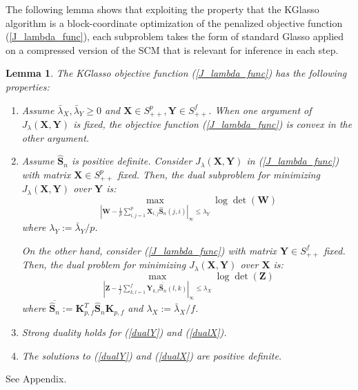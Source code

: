 \documentclass[journal,11pt,draftcls,onecolumn]{IEEEtran}
\def\bK{ {\mathbf{K}} }
\def\bS{ {\mathbf{S}} }
\def\bX{ {\mathbf{X}} }
\def\bY{ {\mathbf{Y}} }
\newtheorem{lemma}{Lemma}
\begin{document}
The following lemma shows that exploiting the property that the KGlasso algorithm is a block-coordinate optimization of the penalized objective function (\ref{J_lambda_func}), each subproblem takes the form of standard Glasso applied on a compressed version of the SCM that is relevant for inference in each step. %

\begin{lemma} \label{dual_lemma}
The  KGlasso objective function (\ref{J_lambda_func}) has the following properties:
\begin{enumerate}
	\item Assume $\bar{\lambda}_X, \bar{\lambda}_Y \geq 0$ and $\bX\in S_{++}^p,\bY\in S_{++}^f$. When one argument of $J_\lambda(\bX,\bY)$ is fixed, the objective function (\ref{J_lambda_func}) is convex in the other argument.
	\item Assume $\hat{\bS}_n$ is positive definite. Consider $J_\lambda(\mathbf{X},\mathbf{Y})$ in (\ref{J_lambda_func}) with matrix $\mathbf{X}\in S_{++}^p$ fixed. Then, the dual subproblem for minimizing $J_\lambda(\mathbf{X},\mathbf{Y})$ over $\mathbf{Y}$ is:
\begin{equation} \label{dualY}
	\max_{ |\mathbf{W}-\frac{1}{p}\sum_{i,j=1}^p{\mathbf{X}_{i,j} \hat{\bS}_n(j,i)}|_{\infty} \leq \lambda_Y }{ \log \det(\mathbf{W})  }
\end{equation}
where $\lambda_Y := \bar{\lambda}_Y/p$.

On the other hand, consider (\ref{J_lambda_func}) with matrix $\mathbf{Y} \in S_{++}^f$ fixed. Then, the dual problem for minimizing $J_\lambda(\mathbf{X},\mathbf{Y})$ over $\bX$ is:
\begin{equation} \label{dualX}
	\max_{ |\mathbf{Z}-\frac{1}{f}\sum_{k,l=1}^f{\mathbf{Y}_{k,l} \overline{\hat{\bS}_n}(l,k)}|_{\infty}\leq \lambda_X  }{ \log \det(\mathbf{Z})  }
\end{equation}
where $\overline{\hat{\bS}_n}:=\bK_{p,f}^T \hat{\bS}_n \bK_{p,f}$ and $\lambda_X := \bar{\lambda}_X/f$.
	
	\item Strong duality holds for (\ref{dualY}) and (\ref{dualX}).
	\item The solutions to (\ref{dualY}) and (\ref{dualX}) are positive definite.
\end{enumerate}
\end{lemma}
\begin{IEEEproof}
	See Appendix.
\end{IEEEproof}
\end{document}
